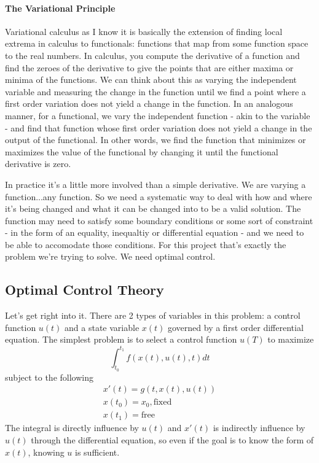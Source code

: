 \documentclass[11pt]{article}
\numberwithin{equation}{section}
\begin{document}
\paragraph{The Variational Principle}
Variational calculus as I know it is basically the extension of finding local extrema in calculus to functionals: functions that map from some function space to the real numbers. In calculus, you compute the derivative of a function and find the zeroes of the derivative to give the points that are either maxima or minima of the functions. We can think about this as varying the independent variable and measuring the change in the function until we find a point where a first order variation does not yield a change in the function. In an analogous manner, for a functional, we vary the independent function - akin to the variable - and find that function whose first order variation does not yield a change in the output of the functional. In other words, we find the function that minimizes or maximizes the value of the functional by changing it until the functional derivative is zero.

In practice it's a little more involved than a simple derivative. We are varying a function...any function. So we need a systematic way to deal with how and where it's being changed and what it can be changed into to be a valid solution. The function may need to satisfy some boundary conditions or some sort of constraint - in the form of an equality, inequaltiy or differential equation - and we need to be able to accomodate those conditions. For this project that's exactly the problem we're trying to solve. We need optimal control.

\subsection{Optimal Control Theory}
Let's get right into it. There are 2 types of variables in this problem: a control function $u(t)$ and a state variable $x(t)$ governed by a first order differential equation. The simplest problem is to select a control function $u(T)$ to maximize
\begin{equation}
\int_{t_0}^{t_1}f(x(t),u(t),t)dt
\end{equation}
subject to the following
\begin{align}
x'(t) = g(t,x(t),u(t)) \\
x(t_0) = x_0, \text{fixed} \\
x(t_1) = \text{free}
\end{align}
The integral is directly influence by $u(t)$ and $x'(t)$ is indirectly influence by $u(t)$ through the differential equation, so even if the goal is to know the form of $x(t)$, knowing $u$ is sufficient.
\end{document}
